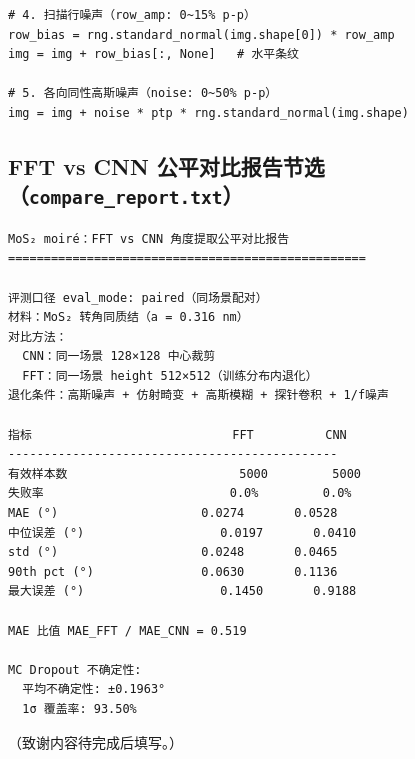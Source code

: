 \documentclass[supercite]{HustGraduPaper}
\begin{document}
\begin{appendices}
\begin{verbatim}
# 4. 扫描行噪声（row_amp: 0~15% p-p）
row_bias = rng.standard_normal(img.shape[0]) * row_amp
img = img + row_bias[:, None]   # 水平条纹

# 5. 各向同性高斯噪声（noise: 0~50% p-p）
img = img + noise * ptp * rng.standard_normal(img.shape)
\end{verbatim}

\subsection{FFT vs CNN 公平对比报告节选（\texttt{compare\_report.txt}）}

\begin{verbatim}
MoS₂ moiré：FFT vs CNN 角度提取公平对比报告
==================================================

评测口径 eval_mode: paired（同场景配对）
材料：MoS₂ 转角同质结（a = 0.316 nm）
对比方法：
  CNN：同一场景 128×128 中心裁剪
  FFT：同一场景 height 512×512（训练分布内退化）
退化条件：高斯噪声 + 仿射畸变 + 高斯模糊 + 探针卷积 + 1/f噪声

指标                            FFT          CNN
----------------------------------------------
有效样本数                        5000         5000
失败率                          0.0%         0.0%
MAE (°)                    0.0274       0.0528
中位误差 (°)                   0.0197       0.0410
std (°)                    0.0248       0.0465
90th pct (°)               0.0630       0.1136
最大误差 (°)                   0.1450       0.9188

MAE 比值 MAE_FFT / MAE_CNN = 0.519

MC Dropout 不确定性:
  平均不确定性: ±0.1963°
  1σ 覆盖率: 93.50%
\end{verbatim}

\end{appendices}

\begin{thankpage}
（致谢内容待完成后填写。）
\end{thankpage}
\end{document}
